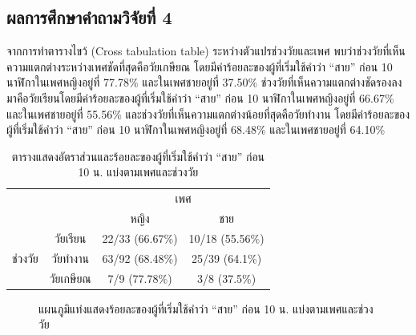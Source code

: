 \documentclass[a4paper]{article}
\begin{document}
\subsection{ผลการศึกษาคำถามวิจัยที่ 4}
    จากการทำตารางไขว้ (Cross tabulation table) ระหว่างตัวแปรช่วงวัยและเพศ พบว่าช่วงวัยที่เห็นความแตกต่างระหว่างเพศชัดที่สุดคือวัยเกษียณ โดยมีค่าร้อยละของผู้ที่เริ่มใช้คำว่า “สาย” ก่อน 10 นาฬิกาในเพศหญิงอยู่ที่ 77.78\% และในเพศชายอยู่ที่ 37.50\% ช่วงวัยที่เห็นความแตกต่างชัดรองลงมาคือวัยเรียนโดยมีค่าร้อยละของผู้ที่เริ่มใช้คำว่า “สาย” ก่อน 10 นาฬิกาในเพศหญิงอยู่ที่ 66.67\% และในเพศชายอยู่ที่ 55.56\% และช่วงวัยที่เห็นความแตกต่างน้อยที่สุดคือวัยทำงาน โดยมีค่าร้อยละของผู้ที่เริ่มใช้คำว่า “สาย” ก่อน 10 นาฬิกาในเพศหญิงอยู่ที่ 68.48\% และในเพศชายอยู่ที่ 64.10\%
    \begin{table}[!ht]
        \begin{center}
        \begin{tabular}{|c|c|c|c|}
            \cline{3-4}
            \multicolumn{2}{c|}{} & \multicolumn{2}{c|}{เพศ} \\
            \cline{3-4}
            \multicolumn{2}{c|}{} & หญิง & ชาย \\
            \hline
            \multirow{3}{*}{ช่วงวัย} & วัยเรียน & 22/33 (66.67\%) & 10/18 (55.56\%) \\
            \cline{2-4}
            & วัยทำงาน & 63/92 (68.48\%) & 25/39 (64.1\%) \\
            \cline{2-4}
            & วัยเกษียณ & 7/9 (77.78\%) & 3/8 (37.5\%) \\
            \hline
        \end{tabular}
        \end{center}
        \caption{ตารางแสดงอัตราส่วนและร้อยละของผู้ที่เริ่มใช้คำว่า “สาย” ก่อน 10 น. แบ่งตามเพศและช่วงวัย}
    \end{table}
    \begin{figure}[!ht]
        \begin{center}
        \end{center}
        \caption{แผนภูมิแท่งแสดงร้อยละของผู้ที่เริ่มใช้คำว่า “สาย” ก่อน 10 น. แบ่งตามเพศและช่วงวัย}
    \end{figure}
    \newpage
\end{document}
